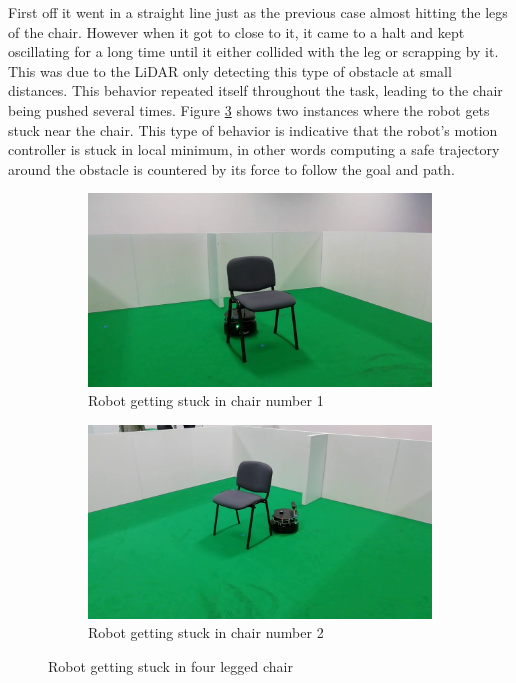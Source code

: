 First off it went in a straight line just as the previous case almost hitting  the legs of the chair. However when it got to close to it, it came to a halt and kept oscillating for a long time until it either collided with the leg or scrapping by it. This was due to the \ac{LiDAR} only detecting this type of obstacle at small distances. This behavior repeated itself throughout the task, leading to the chair being pushed several times. Figure \ref{fig:nchairLF} shows two instances where the robot gets stuck near the chair. This type of behavior is indicative that the robot's motion controller is stuck in local minimum, in other words computing a safe trajectory around the obstacle is countered by its force to follow the goal and path.
\begin{figure}[ht!]
  \centering
  \begin{subfigure}[b]{0.49\linewidth}
    \includegraphics[width=\linewidth]{imgs/chapter5/nchairLF.png}
     \caption{Robot getting stuck in chair number 1}
     \label{fig::nchairLF1}
  \end{subfigure}
  \begin{subfigure}[b]{0.49\linewidth}
    \includegraphics[width=\linewidth]{imgs/chapter5/nchairLF2.png}
    \caption{Robot getting stuck in chair number 2}
    \label{fig::nchairLF2}
  \end{subfigure}
  \caption{Robot getting stuck in four legged chair}
  \label{fig:nchairLF}
\end{figure}

